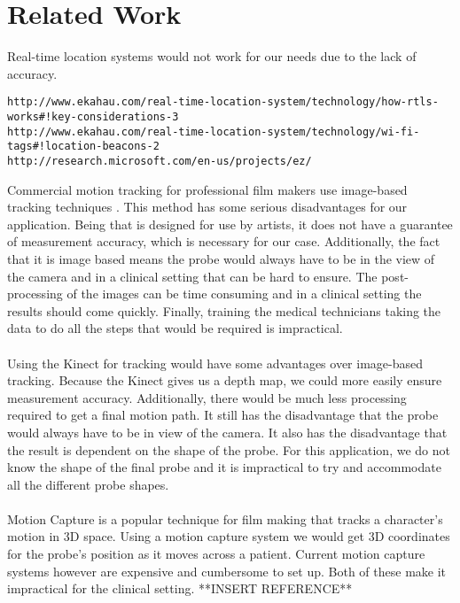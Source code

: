 \documentclass[11pt,psfig]{article}
\begin{document}
\section*{Related Work}

Real-time location systems would not work for our needs due to the lack of accuracy. 
\begin{verbatim}
http://www.ekahau.com/real-time-location-system/technology/how-rtls-works#!key-considerations-3
http://www.ekahau.com/real-time-location-system/technology/wi-fi-tags#!location-beacons-2
http://research.microsoft.com/en-us/projects/ez/
\end{verbatim}

Commercial motion tracking for professional film makers use image-based tracking techniques \cite{trackingwebsite}. This method has some serious disadvantages for our application. Being that is designed for use by artists, it does not have a guarantee of measurement accuracy, which is necessary for our case. Additionally, the fact that it is image based means the probe would always have to be in the view of the camera and in a clinical setting that can be hard to ensure. The post-processing of the images can be time consuming and in a clinical setting the results should come quickly. Finally, training the medical technicians taking the data to do all the steps that would be required is impractical. \\
\\
Using the Kinect for tracking would have some advantages over image-based tracking. Because the Kinect gives us a depth map, we could more easily ensure measurement accuracy. Additionally, there would be much less processing required to get a final motion path. It still has the disadvantage that the probe would always have to be in view of the camera. It also has the disadvantage that the result is dependent on the shape of the probe. For this application, we do not know the shape of the final probe and it is impractical to try and accommodate all the different probe shapes.\\
\\
Motion Capture is a popular technique for film making that tracks a character's motion in 3D space. Using a motion capture system we would get 3D coordinates for the probe's position as it moves across a patient. Current motion capture systems however are expensive and cumbersome to set up. Both of these make it impractical for the clinical setting. **INSERT REFERENCE**\\
\\
\end{document}
